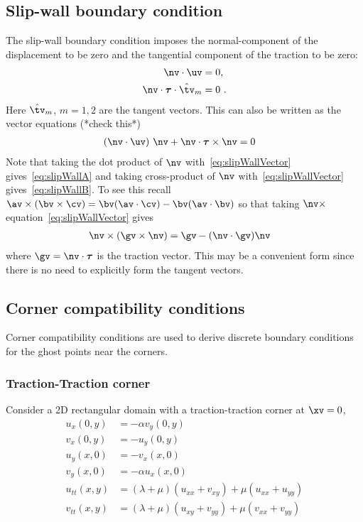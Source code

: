\documentclass[11pt]{article}
\newcommand{\tauv}{\boldsymbol{\tau}}
\begin{document}
\subsection{Slip-wall boundary condition}

The slip-wall boundary condition imposes the normal-component of the displacement to
be zero and the tangential component of the traction to be zero: 
\begin{align}
  \nv\cdot\uv &=0 ,  \label{eq:slipWallA} \\ 
  \nv\cdot\tauv\cdot\hat{\tv}_m &= 0~.\label{eq:slipWallB}
\end{align}
Here $\hat{\tv}_m$, $m=1,2$ are the tangent vectors. 
This can also be written as the vector equations (*check this*)
\begin{align}
   (\nv\cdot\uv)~\nv + \nv\cdot\tauv\times\nv &= 0 \label{eq:slipWallVector}
\end{align}
Note that taking the dot product of $\nv$ with~\eqref{eq:slipWallVector} gives~\eqref{eq:slipWallA}
and taking cross-product of $\nv$ with~\eqref{eq:slipWallVector} gives~\eqref{eq:slipWallB}. 
To see this recall $\av\times(\bv\times\cv)=\bv(\av\cdot\cv)-\bv(\av\cdot\bv)$ so that
taking $\nv\times$ equation~\eqref{eq:slipWallVector} gives 
\begin{align*}
   \nv\times(\gv\times\nv) &= \gv - (\nv\cdot\gv)\nv 
\end{align*}
where $\gv=\nv\cdot\tauv$ is the traction vector. 
This may be a convenient form since there is no need to explicitly form the tangent vectors. 

\clearpage
\subsection{Corner compatibility conditions}

Corner compatibility conditions are used to derive discrete boundary conditions for the
ghost points near the corners.

\subsubsection{Traction-Traction corner} \label{sec:tractionTractionCorner}


Consider a 2D rectangular domain with a traction-traction corner at $\xv=0$,
\begin{align}
   u_x(0,y) &= - \alpha v_y(0,y) \\
   v_x(0,y) &= - u_y(0,y) \\
   u_y(x,0) &= -v_x(x,0) \\
   v_y(x,0) &= - \alpha u_x(x,0)  \\
   u_{tt}(x,y) &= (\lambda+\mu)(u_{xx} + v_{xy}) + \mu(u_{xx} + u_{yy}) \label{eq:utt} \\
   v_{tt}(x,y) &= (\lambda+\mu)(u_{xy} + v_{yy}) + \mu(v_{xx} + v_{yy}) \label{eq:vtt} 
\end{align}
\end{document}

